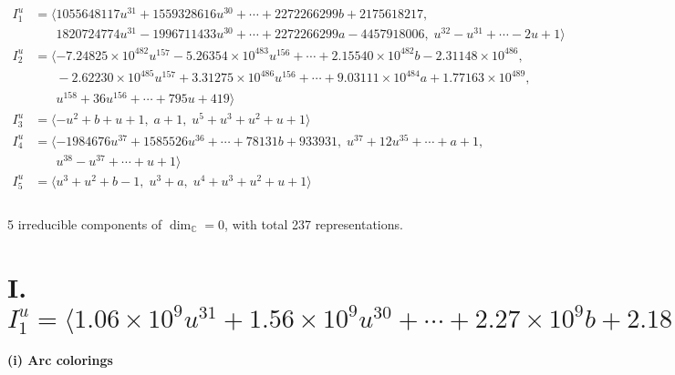 \documentclass[1p]{elsarticle_modified}
\theoremstyle{definition}
\begin{document}
\begin{align*}
I^u_{1}&=\langle 
1055648117 u^{31}+1559328616 u^{30}+\cdots+2272266299 b+2175618217,\\
\phantom{I^u_{1}}&\phantom{= \langle  }1820724774 u^{31}-1996711433 u^{30}+\cdots+2272266299 a-4457918006,\;u^{32}- u^{31}+\cdots-2 u+1\rangle \\
I^u_{2}&=\langle 
-7.24825\times10^{482} u^{157}-5.26354\times10^{483} u^{156}+\cdots+2.15540\times10^{482} b-2.31148\times10^{486},\\
\phantom{I^u_{2}}&\phantom{= \langle  }-2.62230\times10^{485} u^{157}+3.31275\times10^{486} u^{156}+\cdots+9.03111\times10^{484} a+1.77163\times10^{489},\\
\phantom{I^u_{2}}&\phantom{= \langle  }u^{158}+36 u^{156}+\cdots+795 u+419\rangle \\
I^u_{3}&=\langle 
- u^2+b+u+1,\;a+1,\;u^5+u^3+u^2+u+1\rangle \\
I^u_{4}&=\langle 
-1984676 u^{37}+1585526 u^{36}+\cdots+78131 b+933931,\;u^{37}+12 u^{35}+\cdots+a+1,\\
\phantom{I^u_{4}}&\phantom{= \langle  }u^{38}- u^{37}+\cdots+u+1\rangle \\
I^u_{5}&=\langle 
u^3+u^2+b-1,\;u^3+a,\;u^4+u^3+u^2+u+1\rangle \\
\\
\end{align*}
\raggedright * 5 irreducible components of $\dim_{\mathbb{C}}=0$, with total 237 representations.\\
\newpage
\renewcommand{\arraystretch}{1}
\centering \section*{I. $I^u_{1}= \langle 1.06\times10^{9} u^{31}+1.56\times10^{9} u^{30}+\cdots+2.27\times10^{9} b+2.18\times10^{9},\;1.82\times10^{9} u^{31}-2.00\times10^{9} u^{30}+\cdots+2.27\times10^{9} a-4.46\times10^{9},\;u^{32}- u^{31}+\cdots-2 u+1 \rangle$}
\flushleft \textbf{(i) Arc colorings}\\
\end{document}
